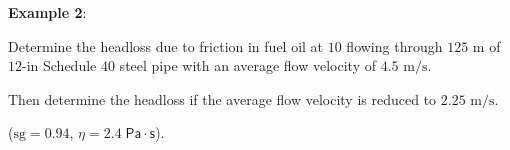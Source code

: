 \documentclass[10pt]{amsart}
\begin{document}
\begin{multicols}{2}
% 	
\vfill
\pagebreak
\Large	


	\textbf{Example 2}:
	
		Determine the headloss due to friction in fuel oil at $10$\textcelsius{} flowing through $125\text{ m}$ 
			of $12$-in Schedule $40$ steel pipe with an average flow velocity of $4.5\text{ m/s}$. \par\medskip
			Then determine the headloss if the average flow velocity is reduced to $2.25\text{ m/s}$.\par\medskip 
			($\text{sg}=0.94$, $\eta=2.4\;\mathsf{Pa\cdot s}$).\par\medskip



\end{multicols}
\end{document}
